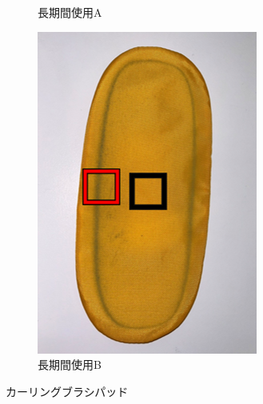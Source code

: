 \documentclass[main]{subfiles}
\begin{document}
\begin{figure}[htbp]
\begin{subfigure}[htbp]{0.3\linewidth}
        \caption{長期間使用A}
        \label{fig:labelD}
    \end{subfigure}
    \begin{subfigure}[htbp]{0.3\linewidth}
        \centering
        \includegraphics[keepaspectratio, width=0.8\linewidth, height=\linewidth]{figures/caring_brush_pad/choukiB.png}
        \caption{長期間使用B}
        \label{fig:labelE}
    \end{subfigure}
    \caption{カーリングブラシパッド}
    \label{fig:sample1}
\end{figure}
\end{document}
